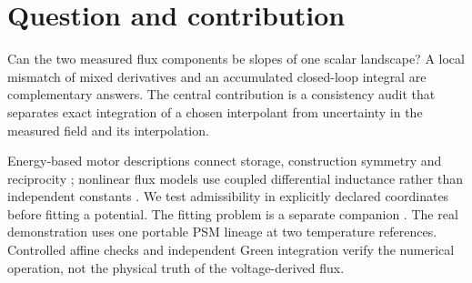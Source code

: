 \section{Question and contribution}
Can the two measured flux components be slopes of one scalar landscape?
A local mismatch of mixed derivatives and an accumulated closed-loop integral
are complementary answers. The central contribution is a consistency audit
that separates exact integration of a chosen interpolant from uncertainty in
the measured field and its interpolation.

Energy-based motor descriptions connect storage, construction symmetry and
reciprocity \cite{jebai2014,haus1989}; nonlinear flux models use coupled
differential inductance rather than independent constants \cite{sun2020}.
We test admissibility in explicitly declared coordinates before fitting a
potential. The fitting problem is a separate companion \cite{companion-reconstruction}.
The real demonstration uses one portable PSM lineage at two temperature
references. Controlled affine checks and independent Green integration verify
the numerical operation, not the physical truth of the voltage-derived flux.
